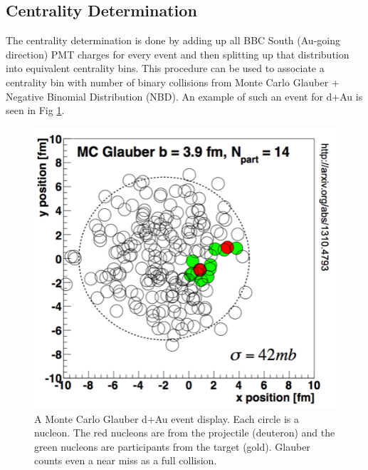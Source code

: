 \subsection{Centrality Determination}
\label{sec:central_determin}
The centrality determination is done by adding up all BBC South (Au-going direction) PMT charges for every event and then splitting up that distribution into equivalent centrality bins. This procedure can be used to associate a centrality bin with number of binary collisions from Monte Carlo Glauber + Negative Binomial Distribution (NBD). An example of such an event for d+Au is seen in Fig \ref{fig:glauber_event_display}. 
\label{centrality_determination}
\begin{figure}
\begin{center}
\includegraphics[width=0.5\linewidth]{figs/glauber_event_display.png}
\caption{A Monte Carlo Glauber d+Au event display. Each circle is a nucleon. The red nucleons are from the projectile (deuteron) and the green nucleons are participants from the target (gold). Glauber counts even a near miss as a full collision.}
\label{fig:glauber_event_display}
\end{center}
\end{figure}

